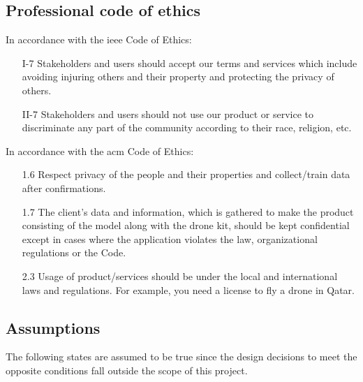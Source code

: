 \documentclass[../main.tex]{subfiles}
\begin{document}
\subsection{Professional code of ethics}

\noindent
In accordance with the \gls{ieee} Code of Ethics:
\begin{itemize}
    \item[I-7] Stakeholders and users 
        should accept our terms and services which include 
        avoiding injuring others and their property 
        and protecting the privacy of others.
    \item[II-7] Stakeholders and users should not use our product 
        or service to discriminate any
        part of the community according 
        to their race, religion, etc.
\end{itemize}

\noindent
In accordance with the \gls{acm} Code of Ethics:
\begin{itemize}
    \item[1.6] Respect privacy of the people and their 
        properties and collect/train data after confirmations.
    \item[1.7] The client's data and information, which is gathered 
        to make the product consisting of the model along with 
        the drone kit, should be kept confidential except in cases 
        where the application violates the law, 
        organizational regulations or the Code.
    \item[2.3] Usage of product/services should be under 
        the local and international laws and regulations. 
        For example, you need a license to fly a drone in Qatar.
\end{itemize}

\subsection{Assumptions}

The following states are assumed to be true
since the design decisions to meet the opposite
conditions fall outside the scope of this project.
\end{document}
